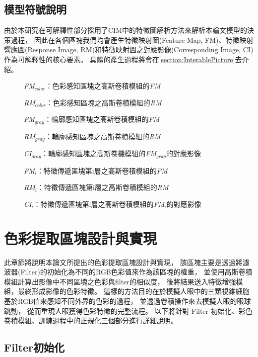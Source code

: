 \documentclass[class=NCU_thesis, crop=false]{standalone}
\begin{document}
\pagebreak

\subsection{模型符號說明}
	由於本研究在可解釋性部分採用了CIM中的特徵圖解析方法來解析本論文模型的決策過程，
	因此在各個區塊我們均會產生特徵映射圖(Feature Map, FM)、特徵映射響應圖(Response Image, RM)和特徵映射圖之對應影像(Corresponding Image, CI)作為可解釋性的核心要素。
	具體的產生過程將會在\cref{section:InterablePicture}去介紹。

	\begin{description}
		\item[]\textit{FM}$_{color}$：色彩感知區塊之高斯卷積模組的\textit{FM}
		\item[]\textit{RM}$_{color}$：色彩感知區塊之高斯卷積模組的\textit{RM}
		
		\item[]\textit{FM}$_{gray}$：輪廓感知區塊之高斯卷積模組的\textit{FM}
		\item[]\textit{RM}$_{gray}$：輪廓感知區塊之高斯卷積模組的\textit{RM}
		\item[]\textit{CI}$_{gray}$：輪廓感知區塊之高斯卷機模組的\textit{FM}$_{gray}$的對應影像

		\item[]\textit{FM}$_{i}$：特徵傳遞區塊第i層之高斯卷積模組的\textit{FM}
		\item[]\textit{RM}$_{i}$：特徵傳遞區塊第i層之高斯卷積模組的\textit{RM}
		\item[]\textit{CI}$_{i}$：特徵傳遞區塊第i層之高斯卷積模組的\textit{FM}$_{i}$的對應影像
	\end{description}

\pagebreak

\section{色彩提取區塊設計與實現}

此章節將說明本論文所提出的色彩提取區塊設計與實現，
該區塊主要是透過將濾波器(Filter)的初始化為不同的RGB色彩值來作為該區塊的權重，
並使用高斯卷積模組計算出影像中不同區塊之色彩與filter的相似度，
後將結果送入特徵增強模組，最終形成影像的色彩特徵。
這樣的方法目的在於模擬人眼中的三類視錐細胞基於RGB值來感知不同外界的色彩的過程，
並透過卷積操作來去模擬人眼的眼球跳動，
從而重現人眼獲得色彩特徵的完整流程。
以下將針對 Filter 初始化、彩色卷積模組、訓練過程中的正規化三個部分進行詳細說明。

	\subsection{Filter初始化}
\end{document}
